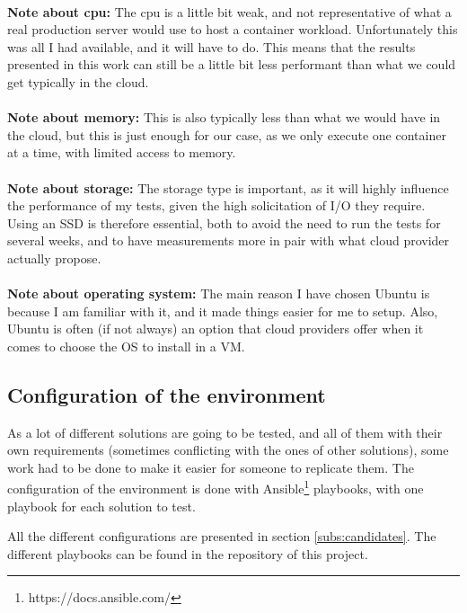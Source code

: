 \paragraph{}\textbf{Note about cpu:}  The cpu is a little bit weak, and not representative of what a real production server would use to host a container workload.  Unfortunately this was all I had available, and it will have to do.  This means that the results presented in this work can still be a little bit less performant than what we could get typically in the cloud.
\paragraph{}\textbf{Note about memory:}  This is also typically less than what we would have in the cloud, but this is just enough for our case, as we only execute one container at a time, with limited access to memory.
\paragraph{}\textbf{Note about storage:}  The storage type is important, as it will highly influence the performance of my tests, given the high solicitation of I/O they require.  Using an SSD is therefore essential, both to avoid the need to run the tests for several weeks, and to have measurements more in pair with what cloud provider actually propose.
\paragraph{}\textbf{Note about operating system:}  The main reason I have chosen Ubuntu is because I am familiar with it, and it made things easier for me to setup.  Also, Ubuntu is often (if not always) an option that cloud providers offer when it comes to choose the OS to install in a VM.

\subsection{Configuration of the environment}
As a lot of different solutions are going to be tested, and all of them with their own requirements (sometimes conflicting with the ones of other solutions), some work had to be done to make it easier for someone to replicate them.  The configuration of the environment is done with Ansible\footnote{https://docs.ansible.com/} playbooks, with one playbook for each solution to test.

All the different configurations are presented in section \ref{subs:candidates}.  The different playbooks can be found in the repository of this project. %

